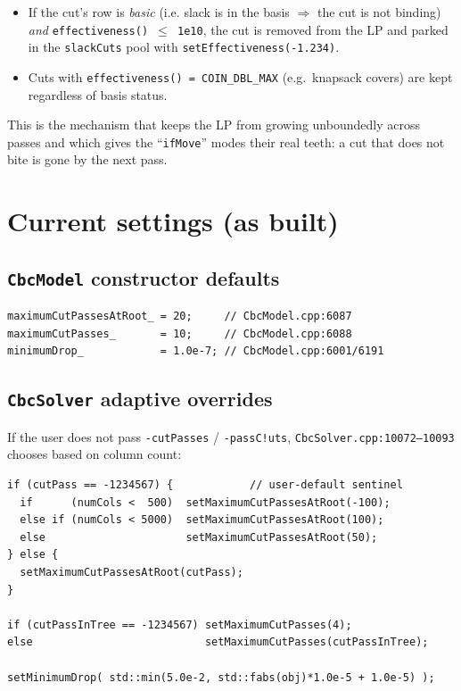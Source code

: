\documentclass[11pt,a4paper]{article}
\begin{document}
\begin{itemize}[leftmargin=*]
  \item If the cut's row is \emph{basic} (i.e. slack is in the
        basis $\Rightarrow$ the cut is not binding) \emph{and}
        \texttt{effectiveness() $\le$ 1e10}, the cut is removed from
        the LP and parked in the \texttt{slackCuts} pool with
        \texttt{setEffectiveness(-1.234)}.
  \item Cuts with \texttt{effectiveness() = COIN\_DBL\_MAX} (e.g.\
        knapsack covers) are kept regardless of basis status.
\end{itemize}

This is the mechanism that keeps the LP from growing unboundedly
across passes and which gives the ``\texttt{ifMove}'' modes their
real teeth: a cut that does not bite is gone by the next pass.

\section{Current settings (as built)}
\label{sec:settings}

\subsection*{\texttt{CbcModel} constructor defaults}

\begin{lstlisting}
maximumCutPassesAtRoot_ = 20;     // CbcModel.cpp:6087
maximumCutPasses_       = 10;     // CbcModel.cpp:6088
minimumDrop_            = 1.0e-7; // CbcModel.cpp:6001/6191
\end{lstlisting}

\subsection*{\texttt{CbcSolver} adaptive overrides}

If the user does not pass \texttt{-cutPasses} / \texttt{-passC!uts},
\texttt{CbcSolver.cpp:10072--10093} chooses based on column count:

\begin{lstlisting}
if (cutPass == -1234567) {            // user-default sentinel
  if      (numCols <  500)  setMaximumCutPassesAtRoot(-100);
  else if (numCols < 5000)  setMaximumCutPassesAtRoot(100);
  else                      setMaximumCutPassesAtRoot(50);
} else {
  setMaximumCutPassesAtRoot(cutPass);
}

if (cutPassInTree == -1234567) setMaximumCutPasses(4);
else                           setMaximumCutPasses(cutPassInTree);

setMinimumDrop( std::min(5.0e-2, std::fabs(obj)*1.0e-5 + 1.0e-5) );
\end{lstlisting}
\end{document}
